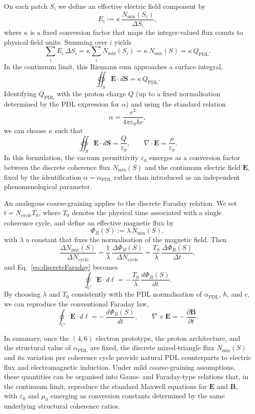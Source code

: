\documentclass[11pt,a4paper]{article}
\begin{document}
On each patch $S_{i}$ we define an effective electric field component by
\begin{equation}
E_{i} := \kappa\,\frac{N_{\mathrm{mix}}(S_{i})}{\Delta S_{i}},
\label{eq:EpatchDef}
\end{equation}
where $\kappa$ is a fixed conversion factor that maps the integer-valued flux counts to physical field units.
Summing over $i$ yields
\[
\sum_{i} E_{i}\,\Delta S_{i}
= \kappa \sum_{i} N_{\mathrm{mix}}(S_{i})
= \kappa\,N_{\mathrm{mix}}(S)
= \kappa\,Q_{\mathrm{PDL}}.
\]
In the continuum limit, this Riemann sum approaches a surface integral,
\[
\oiint_{S} \mathbf{E}\cdot d\mathbf{S} = \kappa\,Q_{\mathrm{PDL}}.
\]
Identifying $Q_{\mathrm{PDL}}$ with the proton charge $Q$ (up to a fixed normalisation determined by the PDL expression for $\alpha$) and using the standard relation
\[
\alpha = \frac{e^{2}}{4\pi\varepsilon_{0}\hbar c},
\]
we can choose $\kappa$ such that
\[
\oiint_{S} \mathbf{E}\cdot d\mathbf{S} = \frac{Q}{\varepsilon_{0}},
\qquad
\nabla\cdot\mathbf{E} = \frac{\rho}{\varepsilon_{0}}.
\]
In this formulation, the vacuum permittivity $\varepsilon_{0}$ emerges as a conversion factor between the discrete coherence flux $N_{\mathrm{mix}}(S)$ and the continuum electric field $\mathbf{E}$, fixed by the identification $\alpha=\alpha_{\mathrm{PDL}}$ rather than introduced as an independent phenomenological parameter.\cite{Laubscher2026Alpha}

An analogous coarse-graining applies to the discrete Faraday relation.
We set $t = N_{\mathrm{cycle}} T_{0}$, where $T_{0}$ denotes the physical time associated with a single coherence cycle, and define an effective magnetic flux by
\[
\Phi_{B}(S) := \lambda\,N_{\mathrm{mix}}(S),
\]
with $\lambda$ a constant that fixes the normalisation of the magnetic field.
Then
\[
\frac{\Delta N_{\mathrm{mix}}(S)}{\Delta N_{\mathrm{cycle}}}
= \frac{1}{\lambda}\,\frac{\Delta \Phi_{B}(S)}{\Delta N_{\mathrm{cycle}}}
= \frac{T_{0}}{\lambda}\,\frac{\Delta \Phi_{B}(S)}{\Delta t},
\]
and Eq.~\eqref{eq:discreteFaraday} becomes
\[
\oint_{C} \mathbf{E}\cdot d\boldsymbol{\ell}
= -\,\frac{T_{0}}{\lambda}\,\frac{d \Phi_{B}(S)}{dt}.
\]
By choosing $\lambda$ and $T_{0}$ consistently with the PDL normalisation of $\alpha_{\mathrm{PDL}}$, $\hbar$, and $c$, we can reproduce the conventional Faraday law,
\[
\oint_{C} \mathbf{E}\cdot d\boldsymbol{\ell}
= -\,\frac{d \Phi_{B}(S)}{dt},
\qquad
\nabla\times\mathbf{E} = -\,\frac{\partial \mathbf{B}}{\partial t}.
\]

In summary, once the $(4,6)$ electron prototype, the proton architecture, and the structural value of $\alpha_{\mathrm{PDL}}$ are fixed, the discrete mixed-triangle flux $N_{\mathrm{mix}}(S)$ and its variation per coherence cycle provide natural PDL counterparts to electric flux and electromagnetic induction.
Under mild coarse-graining assumptions, these quantities can be organised into Gauss- and Faraday-type relations that, in the continuum limit, reproduce the standard Maxwell equations for $\mathbf{E}$ and $\mathbf{B}$, with $\varepsilon_{0}$ and $\mu_{0}$ emerging as conversion constants determined by the same underlying structural coherence ratios.
\end{document}
